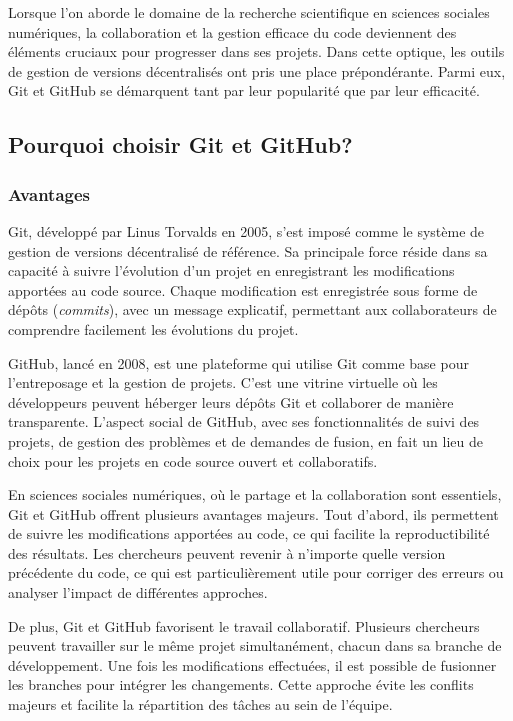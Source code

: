 \documentclass[
  letterpaper,
]{scrbook}
\begin{document}
Lorsque l'on aborde le domaine de la recherche scientifique en sciences
sociales numériques, la collaboration et la gestion efficace du code
deviennent des éléments cruciaux pour progresser dans ses projets. Dans
cette optique, les outils de gestion de versions décentralisés ont pris
une place prépondérante. Parmi eux, Git et GitHub se démarquent tant par
leur popularité que par leur efficacité.

\hypertarget{pourquoi-choisir-git-et-github}{%
\subsection{Pourquoi choisir Git et
GitHub?}\label{pourquoi-choisir-git-et-github}}

\hypertarget{avantages-1}{%
\subsubsection{Avantages}\label{avantages-1}}

Git, développé par Linus Torvalds en 2005, s'est imposé comme le système
de gestion de versions décentralisé de référence. Sa principale force
réside dans sa capacité à suivre l'évolution d'un projet en enregistrant
les modifications apportées au code source. Chaque modification est
enregistrée sous forme de dépôts (\emph{commits}), avec un message
explicatif, permettant aux collaborateurs de comprendre facilement les
évolutions du projet.

GitHub, lancé en 2008, est une plateforme qui utilise Git comme base
pour l'entreposage et la gestion de projets. C'est une vitrine virtuelle
où les développeurs peuvent héberger leurs dépôts Git et collaborer de
manière transparente. L'aspect social de GitHub, avec ses
fonctionnalités de suivi des projets, de gestion des problèmes et de
demandes de fusion, en fait un lieu de choix pour les projets en code
source ouvert et collaboratifs.

En sciences sociales numériques, où le partage et la collaboration sont
essentiels, Git et GitHub offrent plusieurs avantages majeurs. Tout
d'abord, ils permettent de suivre les modifications apportées au code,
ce qui facilite la reproductibilité des résultats. Les chercheurs
peuvent revenir à n'importe quelle version précédente du code, ce qui
est particulièrement utile pour corriger des erreurs ou analyser
l'impact de différentes approches.

De plus, Git et GitHub favorisent le travail collaboratif. Plusieurs
chercheurs peuvent travailler sur le même projet simultanément, chacun
dans sa branche de développement. Une fois les modifications effectuées,
il est possible de fusionner les branches pour intégrer les changements.
Cette approche évite les conflits majeurs et facilite la répartition des
tâches au sein de l'équipe.
\end{document}
